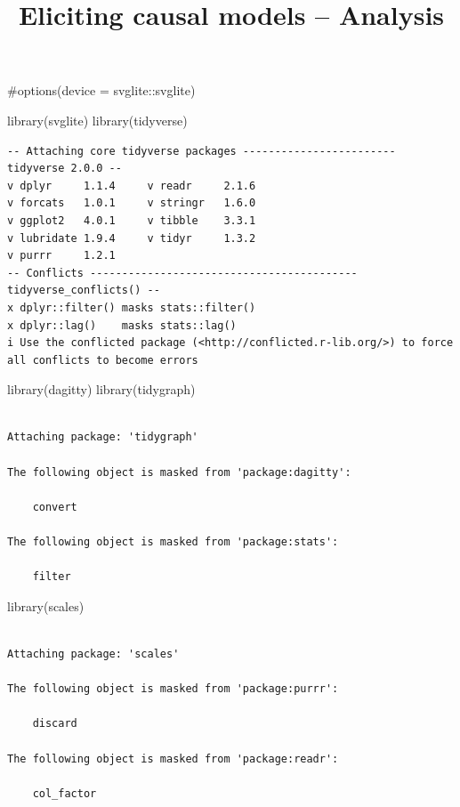 \documentclass[
  letterpaper,
  DIV=11,
  numbers=noendperiod]{scrartcl}
\title{Eliciting causal models -- Analysis}
\author{}
\date{}
\newenvironment{Shaded}{\begin{snugshade}}{\end{snugshade}}
\newcommand{\CommentTok}[1]{\textcolor[rgb]{0.37,0.37,0.37}{#1}}
\newcommand{\FunctionTok}[1]{\textcolor[rgb]{0.28,0.35,0.67}{#1}}
\newcommand{\NormalTok}[1]{\textcolor[rgb]{0.00,0.23,0.31}{#1}}
\begin{document}
\maketitle


\begin{Shaded}
\begin{Highlighting}[]
\CommentTok{\#options(device = svglite::svglite)}

\FunctionTok{library}\NormalTok{(svglite)}
\FunctionTok{library}\NormalTok{(tidyverse)}
\end{Highlighting}
\end{Shaded}

\begin{verbatim}
-- Attaching core tidyverse packages ------------------------ tidyverse 2.0.0 --
v dplyr     1.1.4     v readr     2.1.6
v forcats   1.0.1     v stringr   1.6.0
v ggplot2   4.0.1     v tibble    3.3.1
v lubridate 1.9.4     v tidyr     1.3.2
v purrr     1.2.1     
-- Conflicts ------------------------------------------ tidyverse_conflicts() --
x dplyr::filter() masks stats::filter()
x dplyr::lag()    masks stats::lag()
i Use the conflicted package (<http://conflicted.r-lib.org/>) to force all conflicts to become errors
\end{verbatim}

\begin{Shaded}
\begin{Highlighting}[]
\FunctionTok{library}\NormalTok{(dagitty)}
\FunctionTok{library}\NormalTok{(tidygraph)}
\end{Highlighting}
\end{Shaded}

\begin{verbatim}

Attaching package: 'tidygraph'

The following object is masked from 'package:dagitty':

    convert

The following object is masked from 'package:stats':

    filter
\end{verbatim}

\begin{Shaded}
\begin{Highlighting}[]
\FunctionTok{library}\NormalTok{(scales)}
\end{Highlighting}
\end{Shaded}

\begin{verbatim}

Attaching package: 'scales'

The following object is masked from 'package:purrr':

    discard

The following object is masked from 'package:readr':

    col_factor
\end{verbatim}
\end{document}
